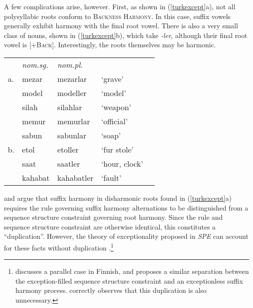 A few complications arise, however. First, as shown in (\ref{turkexcept}a), not all polysyllabic roots conform to \textsc{Backness Harmony}. In this case, suffix vowels generally exhibit harmony with the final root vowel. There is also a very small class of nouns, shown in (\ref{turkexcept}b), which take \emph{-ler}, although their final root vowel is [$+$\textsc{Back}]. Interestingly, the roots themselves may be harmonic.

\begin{example} 
\label{turkexcept}
\begin{tabular}{lllll}
   & \emph{nom.sg.} & \emph{nom.pl.}&                    \\
a. & {mezar}        & {mezarlar}    & `grave'       & \citep{TELL}       \\
   & {model}        & {modeller}    & `model'                            \\
   & {silah}        & {silahlar}    & `weapon'                           \\
   & {memur}        & {memurlar}    & `official'                         \\
   & {sabun}        & {sabunlar}    & `soap'                             \\
b. & {etol}         & {etoller}     & `fur stole'   & \citep{Goksel2005} \\
   & {saat}         & {saatler}     & `hour, clock' 	              \\
   & {kahabat}      & {kahabatler}  & `fault'       \\
\end{tabular}
\end{example}

\citet[212]{A74} and \citet{Iverson1978} argue that suffix harmony in disharmonic roots found in (\ref{turkexcept}a) requires the rule governing suffix harmony alternations to be distinguished from a sequence structure constraint governing root harmony. 
Since the rule and sequence structure constraint are otherwise identical, this constitutes a ``duplication''. 
However, the theory of exceptionality proposed in \emph{SPE} can account for these facts without duplication \citep[197f.]{Zonneveld1978}.\footnote{
    \citet[29f.]{Kiparsky1968} discusses a parallel case in Finnish, and proposes a similar separation between the exception-filled sequence structure constraint and an exceptionless suffix harmony process. 
    \citet[171f.]{Howard1972} correctly observes that this duplication is also unnecessary.}

